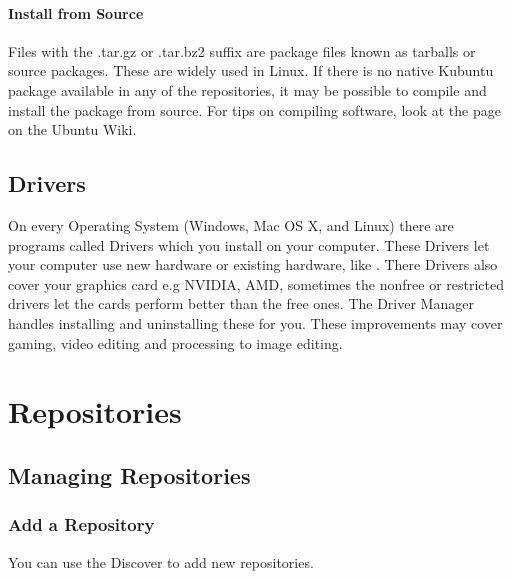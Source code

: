 \documentclass[letterpaper,10pt,english]{sphinxmanual}
\begin{document}
\subsubsection{Install from Source}
\label{\detokenize{docs/advanced:install-from-source}}
Files with the .tar.gz or .tar.bz2 suffix are package files known as \sphinxquotedblleft{}tarballs\sphinxquotedblright{} or \sphinxquotedblleft{}source\sphinxquotedblright{} packages. These are widely used in Linux. If there is no native Kubuntu package available in any of the repositories, it may be possible to compile and install the package from source. For tips on compiling software, look at the  page on the Ubuntu Wiki.


\section{Drivers}
\label{\detokenize{docs/advanced:drivers}}
On every Operating System (Windows, Mac OS X, and Linux) there are programs called Drivers which you install on your computer. These Drivers let your computer use new hardware or existing hardware, like . There Drivers also cover your graphics card e.g NVIDIA, AMD, sometimes the nonfree or restricted drivers let the cards perform better than the free ones. The Driver Manager handles installing and uninstalling these for you. These improvements may cover gaming, video editing and processing to image editing.


\chapter{Repositories}
\label{\detokenize{docs/repositories:repositories-link}}\label{\detokenize{docs/repositories::doc}}\label{\detokenize{docs/repositories:repositories}}

\section{Managing Repositories}
\label{\detokenize{docs/repositories:managing-repositories}}

\subsection{Add a Repository}
\label{\detokenize{docs/repositories:add-a-repository}}
You can use the Discover to add new repositories.
\end{document}
